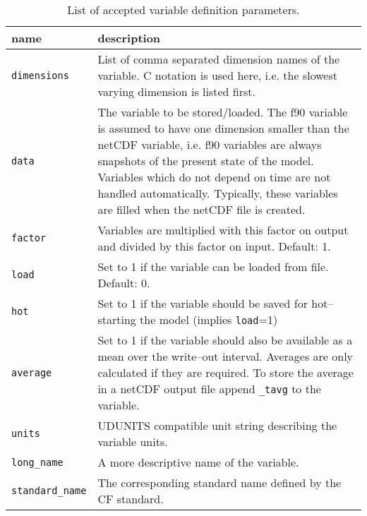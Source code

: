 \begin{table}[htbp]
 \begin{center}
  \begin{tabular*}{\textwidth}{@{\extracolsep{\fill}}|l|p{10cm}|}
    \hline
    name & description \\
    \hline
    \hline
    \texttt{dimensions} & List of comma separated dimension names of the variable. C notation is used here, i.e. the slowest varying dimension is listed first.\\
    \hline
    \texttt{data} & The variable to be stored/loaded. The f90 variable is assumed to have one dimension smaller than the netCDF variable, i.e. f90 variables are always snapshots of the present state of the model. Variables which do not depend on time are not handled automatically. Typically, these variables are filled when the netCDF file is created.\\
    \hline
    \texttt{factor} & Variables are multiplied with this factor on output and divided by this factor on input. Default: 1.\\
    \hline
    \texttt{load} & Set to 1 if the variable can be loaded from file. Default: 0.\\
    \hline
    \texttt{hot} & Set to 1 if the variable should be saved for hot--starting the model (implies \texttt{load}=1)\\
    \hline
    \texttt{average} & Set to 1 if the variable should also be available as a mean over the write--out interval. Averages are only calculated if they are required. To store the average in a netCDF output file append \texttt{\_tavg} to the variable.\\
    \hline
    \texttt{units} & UDUNITS compatible unit string describing the variable units.\\
    \hline
    \texttt{long\_name} & A more descriptive name of the variable.\\
    \hline
    \texttt{standard\_name} & The corresponding standard name defined by the CF standard.\\
    \hline
  \end{tabular*}
  \caption{List of accepted variable definition parameters.}
  \label{dg.tab.vdf}
 \end{center}
\end{table}
